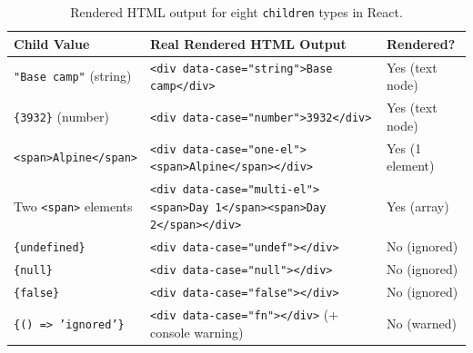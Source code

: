 \documentclass[11pt, a4paper]{article}
\begin{document}
\begin{table}[ht]
\centering
\caption{Rendered HTML output for eight \texttt{children} types in React.}
\label{tab:p3}
\begin{tabularx}{\textwidth}{l X l}
\toprule
\textbf{Child Value} & \textbf{Real Rendered HTML Output} & \textbf{Rendered?} \\
\midrule
\texttt{"Base camp"} (string) & \texttt{<div data-case="string">Base camp</div>} & Yes (text node) \\
\texttt{\{3932\}} (number) & \texttt{<div data-case="number">3932</div>} & Yes (text node) \\
\texttt{<span>Alpine</span>} & \texttt{<div data-case="one-el"><span>Alpine</span></div>} & Yes (1 element) \\
Two \texttt{<span>} elements & \texttt{<div data-case="multi-el"><span>Day 1</span><span>Day 2</span></div>} & Yes (array) \\
\texttt{\{undefined\}} & \texttt{<div data-case="undef"></div>} & No (ignored) \\
\texttt{\{null\}} & \texttt{<div data-case="null"></div>} & No (ignored) \\
\texttt{\{false\}} & \texttt{<div data-case="false"></div>} & No (ignored) \\
\texttt{\{() => 'ignored'\}} & \texttt{<div data-case="fn"></div>} (+ console warning) & No (warned) \\
\bottomrule
\end{tabularx}
\end{table}
\end{document}
